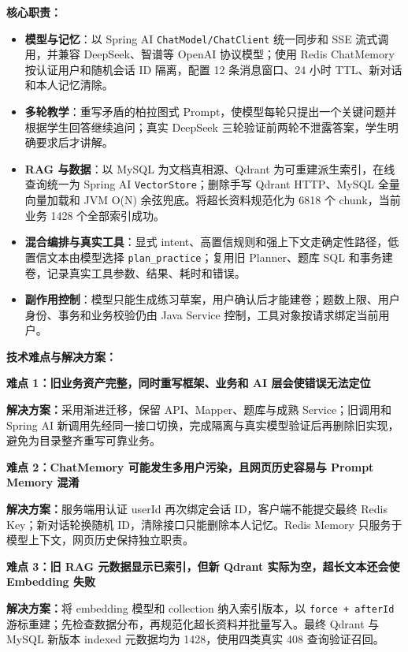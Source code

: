 \textbf{核心职责：}
\begin{itemize}[parsep=0.5ex]
  \item \textbf{模型与记忆}：以 Spring AI \texttt{ChatModel/ChatClient} 统一同步和 SSE 流式调用，并兼容 DeepSeek、智谱等 OpenAI 协议模型；使用 Redis ChatMemory 按认证用户和随机会话 ID 隔离，配置 12 条消息窗口、24 小时 TTL、新对话和本人记忆清除。
  \item \textbf{多轮教学}：重写矛盾的柏拉图式 Prompt，使模型每轮只提出一个关键问题并根据学生回答继续追问；真实 DeepSeek 三轮验证前两轮不泄露答案，学生明确要求后才讲解。
  \item \textbf{RAG 与数据}：以 MySQL 为文档真相源、Qdrant 为可重建派生索引，在线查询统一为 Spring AI \texttt{VectorStore}；删除手写 Qdrant HTTP、MySQL 全量向量加载和 JVM O(N) 余弦兜底。将超长资料规范化为 6818 个 chunk，当前业务 1428 个全部索引成功。
  \item \textbf{混合编排与真实工具}：显式 intent、高置信规则和强上下文走确定性路径，低置信文本由模型选择 \texttt{plan\_practice}；复用旧 Planner、题库 SQL 和事务建卷，记录真实工具参数、结果、耗时和错误。
  \item \textbf{副作用控制}：模型只能生成练习草案，用户确认后才能建卷；题数上限、用户身份、事务和业务校验仍由 Java Service 控制，工具对象按请求绑定当前用户。
\end{itemize}

\textbf{技术难点与解决方案：}

\textbf{难点 1：旧业务资产完整，同时重写框架、业务和 AI 层会使错误无法定位}

\textbf{解决方案：}采用渐进迁移，保留 API、Mapper、题库与成熟 Service；旧调用和 Spring AI 新调用先经同一接口切换，完成隔离与真实模型验证后再删除旧实现，避免为目录整齐重写可靠业务。

\vspace{0.5ex}
\textbf{难点 2：ChatMemory 可能发生多用户污染，且网页历史容易与 Prompt Memory 混淆}

\textbf{解决方案：}服务端用认证 userId 再次绑定会话 ID，客户端不能提交最终 Redis Key；新对话轮换随机 ID，清除接口只能删除本人记忆。Redis Memory 只服务于模型上下文，网页历史保持独立职责。

\vspace{0.5ex}
\textbf{难点 3：旧 RAG 元数据显示已索引，但新 Qdrant 实际为空，超长文本还会使 Embedding 失败}

\textbf{解决方案：}将 embedding 模型和 collection 纳入索引版本，以 \texttt{force + afterId} 游标重建；先检查数据分布，再规范化超长资料并批量写入。最终 Qdrant 与 MySQL 新版本 indexed 元数据均为 1428，使用四类真实 408 查询验证召回。

